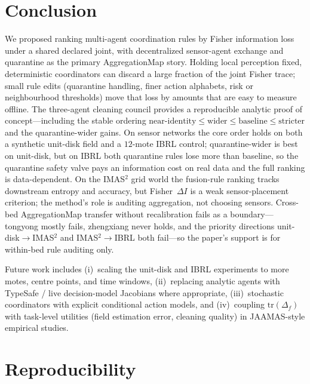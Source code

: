 \documentclass[11pt,a4paper]{article}
\begin{document}
\section{Conclusion}
\label{sec:conclusion}

We proposed ranking multi-agent coordination rules by Fisher information loss
under a shared declared joint, with decentralized sensor-agent exchange and
quarantine as the primary AggregationMap story. Holding local perception
fixed, deterministic coordinators can discard a large fraction of the joint
Fisher trace; small rule edits (quarantine handling, finer action alphabets,
risk or neighbourhood thresholds) move that loss by amounts that are easy to
measure offline. The three-agent cleaning council provides a reproducible
analytic proof of concept---including the stable ordering
$\mathrm{near\text{-}identity}\le\mathrm{wider}\le\mathrm{baseline}
\le\mathrm{stricter}$
and the quarantine-wider gains. On sensor networks the core order holds on
both a synthetic unit-disk field and a $12$-mote IBRL control;
quarantine-wider is best on unit-disk, but on IBRL both quarantine rules lose
more than baseline, so the quarantine safety valve pays an information cost
on real data and the full ranking is data-dependent. On the IMAS$^2$ grid
world the fusion-rule ranking tracks downstream entropy and accuracy, but
Fisher~$\Delta I$ is a weak sensor-placement criterion; the method's role is
auditing aggregation, not choosing sensors. Cross-bed AggregationMap transfer without recalibration fails as a boundary---tongyong mostly fails, zhengxiang never holds, and the priority directions unit-disk$\to$IMAS$^2$ and IMAS$^2\to$IBRL both fail---so the paper's support is for within-bed rule auditing only.

Future work includes (i)~scaling the unit-disk and IBRL experiments to more
motes, centre points, and time windows, (ii)~replacing analytic
agents with TypeSafe / live decision-model Jacobians where appropriate,
(iii)~stochastic coordinators with explicit conditional action models, and
(iv)~coupling $\mathrm{tr}(\Delta_f)$ with task-level utilities (field
estimation error, cleaning quality) in JAAMAS-style empirical studies.

\section*{Reproducibility}
\end{document}

